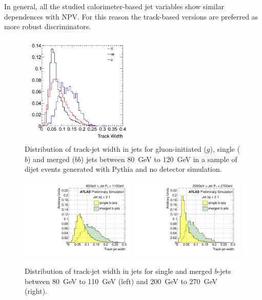  In general, all the studied calorimeter-based jet variables show similar dependences with NPV. For this reason the track-based versions are preferred as more robust discriminators.


\begin{figure}[tp]
\centering
\includegraphics[width=0.49\textwidth]{FIGS/TEMPFigs/PythisStandalone/MaxPlots/trkWidth_bb_b_g_J3_PT80.png}
\caption{Distribution of track-jet width in jets for gluon-initiated ($g$), single ($b$) and merged ($bb$) jets between 80~GeV to 120~GeV in a sample of dijet events generated with {\sc Pythia} and no detector simulation.}
\label{fig:trkwidthsinglemergedPYTHIAgluon}
\end{figure}

\begin{figure}[tp]
\centering
\includegraphics[width=0.49\textwidth]{FIGS/VarsSingleMerged/trkWidth080.pdf}
\includegraphics[width=0.49\textwidth]{FIGS/VarsSingleMerged/trkWidth200.pdf}
\caption{Distribution of track-jet width in jets for single and merged $b$-jets between 80~GeV to 110~GeV (left) and 200~GeV to 270~GeV (right).}
\label{fig:trkwidthsinglemerged}
\end{figure}


